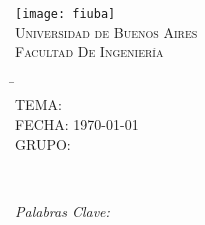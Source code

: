\begin{titlepage}
	
		\thispagestyle{empty}

		\begin{center}
			\texttt{[image: fiuba]}\\
			\large{\textsc{Universidad de Buenos Aires}}\\
			\large{\textsc{Facultad De Ingeniería}}\\
			\small{\myTimePeriod}
		\end{center}

		\vfill

		\begin{center}
			\Large{\underline{\textsc{\mySubject}}}
		\end{center}

		\vfill

		\begin{tabbing}
			\hspace{2cm}\=\+\myTitle\\
				TEMA: \mySubtitle\\
				FECHA: \today\\
				\ifPutgroup
				GRUPO: \texttt{\myGroupNumber}\\
				\fi

			\\
				\MembersHeader
				\MembersOnCover	
		\end{tabbing}

		\begin{abstract}
			
		\end{abstract}

	\ifKeywords
		\begin{center}
			\emph{Palabras Clave: \myKeywords}
		\end{center}
	\fi	

		\vfill
	
\end{titlepage}

\ifPagebreak
	\thispagestyle{empty}
	\ifIndex
		\tableofcontents
	\fi

	\pagebreak
\fi

